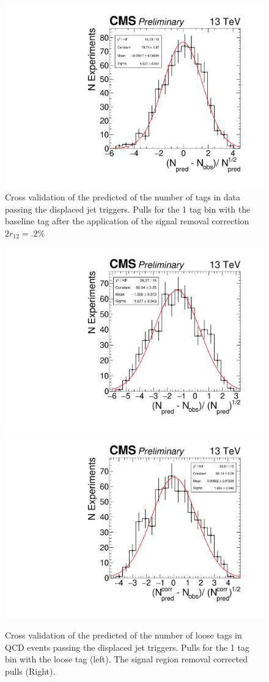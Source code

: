 \begin{figure}
\begin{center}
\includegraphics[width=.45\textwidth]{figures/an/ANALYSIS/pulls/baseline_xval_ndiv25_baseline_1tag.pdf}
\caption{Cross validation of the predicted of the number of tags in data passing the displaced jet triggers. Pulls for the 1 tag bin with the baseline tag after the application of the signal removal correction $2r_{12}=.2\%$ \label{fig:djetpd_1tag_xval_baseline}}
\end{center}
\end{figure}


\begin{figure}
\begin{center}
\includegraphics[width=.45\textwidth]{figures/an/ANALYSIS/pulls/qcd_loose_uncorrected_1tag.pdf}
\includegraphics[width=.45\textwidth]{figures/an/ANALYSIS/pulls/qcd_loose_corrected_1tag.pdf}
\caption{Cross validation of the predicted of the number of loose tags in QCD events passing the displaced jet triggers. Pulls for the 1 tag bin with the loose tag (left). The signal region removal corrected pulls (Right). \label{fig:qcd_1tag_xval}}
\end{center}
\end{figure}

